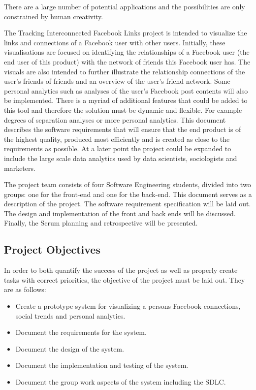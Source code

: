 \documentclass[12pt,onecolumn]{article}
\begin{document}
	There are a large number of potential applications and the possibilities are only constrained by human creativity.
	
	The Tracking Interconnected Facebook Links project is intended to visualize the links and connections of a Facebook user with other users. Initially, these visualisations are focused on identifying the relationships of a Facebook user (the end user of this product) with the network of friends this Facebook user has. The visuals are also intended to further illustrate the relationship connections of the user's friends of friends and an overview of the user's friend network. Some personal analytics such as analyses of the user's Facebook post contents will also be implemented. There is a myriad of additional features that could be added to this tool and therefore the solution must be dynamic and flexible. For example degrees of separation analyses or more personal analytics. This document describes the software requirements that will ensure that the end product is of the highest quality, produced most efficiently and is created as close to the requirements as possible. At a later point the project could be expanded to include the large scale data analytics used by data scientists, sociologists and marketers. 
	
	The project team consists of four Software Engineering students, divided into two groups: one for the front-end and one for the back-end. This document serves as a description of the project. The software requirement specification will be laid out. The design and implementation of the front and back ends will be discussed. Finally, the Scrum planning and retrospective will be presented.
	
	\subsection{Project Objectives} %
	
	In order to both quantify the success of the project as well as properly create tasks with correct priorities, the objective of the project must be laid out. They are as follows:
	
	\begin{itemize}
		
		\item Create a prototype system for visualizing a persons Facebook connections, social trends and personal analytics.
		
		\item Document the requirements for the system.
		
		\item Document the design of the system.
		
		\item Document the implementation and testing of the system.
		
		\item Document the group work aspects of the system including the SDLC.
		
	\end{itemize}
	
\end{document}
